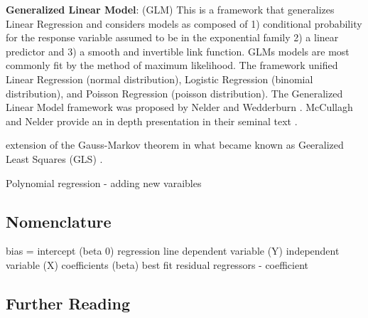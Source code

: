 \begin{bibunit}



\textbf{Generalized Linear Model}: (GLM) This is a framework that generalizes Linear Regression and considers models as composed of 1) conditional probability for the response variable assumed to be in the exponential family 2) a linear predictor and 3) a smooth and invertible link function. GLMs models are most commonly fit by the method of maximum likelihood. The framework unified Linear Regression (normal distribution), Logistic Regression (binomial distribution), and Poisson Regression (poisson distribution). The Generalized Linear Model framework was proposed by Nelder and Wedderburn \cite{Nelder1972}. McCullagh and Nelder provide an in depth presentation in their seminal text \cite{McCullagh1989}.

extension of the Gauss-Markov theorem in what became known as Geeralized Least Squares (GLS) \cite{Aitken1935}.



Polynomial regression - adding new varaibles

\subsection{Nomenclature}

bias = intercept (beta 0)
regression line
dependent variable (Y)
independent variable (X)
coefficients (beta)
best fit
residual
regressors - coefficient


\subsection{Further Reading}



\putbib
\end{bibunit}

\newpage\begin{bibunit}\putbib\end{bibunit}
\newpage\begin{bibunit}\putbib\end{bibunit}
\newpage\begin{bibunit}\putbib\end{bibunit}
\newpage\begin{bibunit}\putbib\end{bibunit}
\newpage\begin{bibunit}\putbib\end{bibunit}

